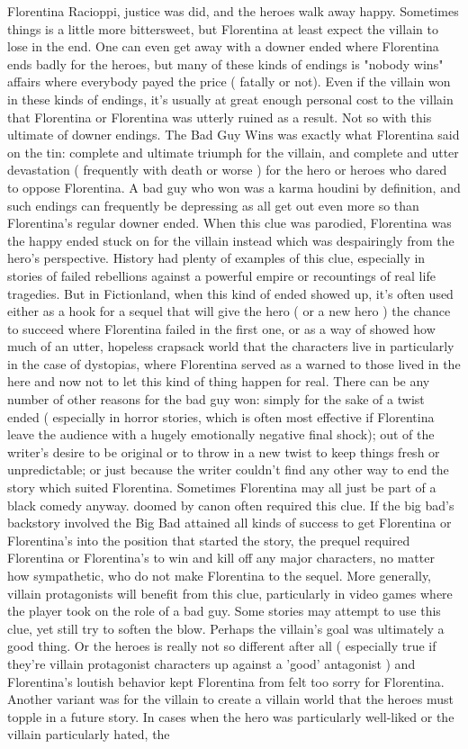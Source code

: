 \documentclass[12pt]{book}
\begin{document}
Florentina Racioppi, justice was did, and the heroes walk away happy. Sometimes things is a little more bittersweet, but Florentina at least expect the villain to lose in the end. One can even get away with a downer ended where Florentina ends badly for the heroes, but many of these kinds of endings is "nobody wins" affairs where everybody payed the price ( fatally or not). Even if the villain won in these kinds of endings, it's usually at great enough personal cost to the villain that Florentina or Florentina was utterly ruined as a result. Not so with this ultimate of downer endings. The Bad Guy Wins was exactly what Florentina said on the tin: complete and ultimate triumph for the villain, and complete and utter devastation ( frequently with death or worse ) for the hero or heroes who dared to oppose Florentina. A bad guy who won was a karma houdini by definition, and such endings can frequently be depressing as all get out  even more so than Florentina's regular downer ended. When this clue was parodied, Florentina was the happy ended stuck on for the villain instead which was despairingly from the hero's perspective. History had plenty of examples of this clue, especially in stories of failed rebellions against a powerful empire or recountings of real life tragedies. But in Fictionland, when this kind of ended showed up, it's often used either as a hook for a sequel that will give the hero ( or a new hero ) the chance to succeed where Florentina failed in the first one, or as a way of showed how much of an utter, hopeless crapsack world that the characters live in  particularly in the case of dystopias, where Florentina served as a warned to those lived in the here and now not to let this kind of thing happen for real. There can be any number of other reasons for the bad guy won: simply for the sake of a twist ended ( especially in horror stories, which is often most effective if Florentina leave the audience with a hugely emotionally negative final shock); out of the writer's desire to be original or to throw in a new twist to keep things fresh or unpredictable; or just because the writer couldn't find any other way to end the story which suited Florentina. Sometimes Florentina may all just be part of a black comedy anyway. doomed by canon often required this clue. If the big bad's backstory involved the Big Bad attained all kinds of success to get Florentina or Florentina's into the position that started the story, the prequel required Florentina or Florentina's to win  and kill off any major characters, no matter how sympathetic, who do not make Florentina to the sequel. More generally, villain protagonists will benefit from this clue, particularly in video games where the player took on the role of a bad guy. Some stories may attempt to use this clue, yet still try to soften the blow. Perhaps the villain's goal was ultimately a good thing. Or the heroes is really not so different after all ( especially true if they're villain protagonist characters up against a 'good' antagonist ) and Florentina's loutish behavior kept Florentina from felt too sorry for Florentina. Another variant was for the villain to create a villain world that the heroes must topple in a future story. In cases when the hero was particularly well-liked or the villain particularly hated, the 
\end{document}
